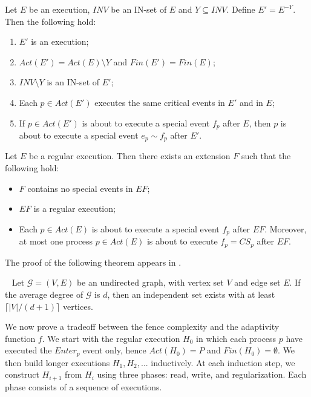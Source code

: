 \begin{lemma} \label{lem: remove-invisibale-processes}
	Let $E$ be an execution, $\mathit{INV}$ be an IN-set of $E$ and $Y \subseteq \mathit{INV}$.
	\newline Define $E' = E^{-Y}$. Then the following hold:
	\begin{enumerate}
		\item $E'$ is an execution;
		\item $Act(E') = Act(E) \setminus Y$ and $Fin(E') = Fin(E)$;
		\item $\mathit{INV} \setminus Y$ is an IN-set of $E'$;
		\item Each $p \in Act(E')$ executes the same critical events in $E'$ and in $E$;
		\item If $p \in Act(E')$ is about to execute a special event $f_p$ after $E$, then $p$ is about to execute a special event $e_p \sim f_p$ after $E'$.
	\end{enumerate}
\end{lemma}

\begin{lemma} \label{lem: next-critical-extension}
	Let $E$ be a regular execution. Then there exists an extension $F$ such that the following hold:
	\begin{itemize}
		\item $F$ contains no special events in $E F$;
		\item $E F$ is a regular execution;
		\item Each $p \in Act(E)$ is about to execute a special event $f_p$ after $E F$. Moreover, at most one process $p \in Act(E)$ is about to execute $f_p=CS_p$ after $E F$.
	\end{itemize}
\end{lemma}

The proof of the following theorem appears in \cite{Bollobas2004}.

\begin{theorem} [Tur\'{a}n] ~\label{th: turan}
	Let $\mathcal{G} = (V,E)$ be an undirected graph, with vertex set $V$ and edge set $E$. If the average degree of $\mathcal{G}$ is $d$, then an independent set exists with at least $\lceil |V|/(d+1) \rceil$ vertices.
\end{theorem}
	
We now prove a tradeoff between the fence complexity and the adaptivity function $f$.
We start with the regular execution $H_0$ in which each process $p$ have executed the $Enter_p$ event only, hence $Act(H_0)=P$ and $Fin(H_0)=\emptyset$. We then build longer executions $H_1,H_2,...$ inductively. At each induction step, we construct $H_{i+1}$ from $H_i$ using three phases: read, write, and regularization. Each phase consists of a sequence of executions.

